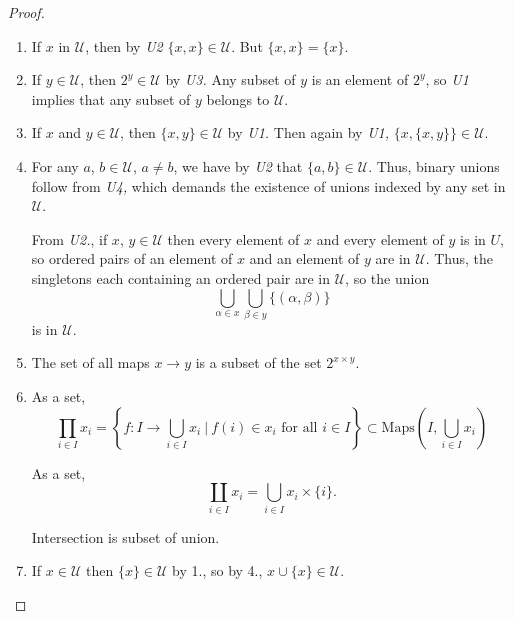 \documentclass[main.tex]{subfiles}
\begin{document}
\begin{proof}
  \leavevmode
  \begin{enumerate}
    \item If $x$ in $\mathcal{U}$, then by \emph{U2} $\{x, x\} \in \mathcal{U}$. But $\{x, x\} = \{x\}$.

    \item If $y \in \mathcal{U}$, then $2^{y} \in \mathcal{U}$ by \emph{U3.} Any subset of $y$ is an element of $2^{y}$, so \emph{U1} implies that any subset of $y$ belongs to $\mathcal{U}$.

    \item If $x$ and $y \in \mathcal{U}$, then $\{x, y\} \in \mathcal{U}$ by \emph{U1.} Then again by \emph{U1,} $\{x, \{x, y\}\} \in \mathcal{U}$.

    \item For any $a$, $b \in \mathcal{U}$, $a \neq b$, we have by \emph{U2} that $\{a, b\} \in \mathcal{U}$. Thus, binary unions follow from \emph{U4,} which demands the existence of unions indexed by any set in $\mathcal{U}$.

      From \emph{U2.}, if $x$, $y \in \mathcal{U}$ then every element of $x$ and every element of $y$ is in $U$, so ordered pairs of an element of $x$ and an element of $y$ are in $\mathcal{U}$. Thus, the singletons each containing an ordered pair are in $\mathcal{U}$, so the union
      \begin{equation*}
        \bigcup_{\alpha \in x} \bigcup_{\beta \in y} \{(\alpha, \beta)\}
      \end{equation*}
      is in $\mathcal{U}$.

    \item The set of all maps $x \to y$ is a subset of the set $2^{x \times y}$.

    \item As a set,
      \begin{equation*}
        \prod_{i \in I} x_{i} = \left\{f\colon I \to \bigcup_{i \in I} x_{i}\ \Big|\ f(i) \in x_{i} \text{ for all }i \in I\right\} \subset \mathrm{Maps}\left(I, \bigcup_{i \in I} x_{i}\right)
      \end{equation*}

      As a set,
      \begin{equation*}
        \coprod_{i \in I} x_{i} = \bigcup_{i \in I} x_{i} \times \{i\}.
      \end{equation*}

      Intersection is subset of union.

    \item If $x \in \mathcal{U}$ then $\{x\} \in \mathcal{U}$ by 1., so by 4., $x \cup \{x\} \in \mathcal{U}$.
  \end{enumerate}
\end{proof}
\end{document}
